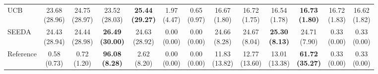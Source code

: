 {\begin{tabular}{l|cccccc|cccccc}
UCB & {\cellcolor[HTML]{C8E6C9}} \makecell{23.68 \\ (28.96)} & \makecell{24.75 \\ (28.97)} & \makecell{23.52 \\ (28.03)} & \bfseries \makecell{25.44 \\ (29.27)} & \makecell{1.97 \\ (4.47)} & \makecell{0.65 \\ (0.97)} & {\cellcolor[HTML]{C8E6C9}} \makecell{16.67 \\ (1.80)} & \makecell{16.72 \\ (1.75)} & \makecell{16.54 \\ (1.78)} & \bfseries \makecell{16.73 \\ (1.80)} & \makecell{16.72 \\ (1.83)} & \makecell{16.62 \\ (1.82)} \\
SEEDA & {\cellcolor[HTML]{C8E6C9}} \makecell{24.43 \\ (28.94)} & \makecell{24.44 \\ (28.98)} & \bfseries \makecell{26.49 \\ (30.00)} & \makecell{24.63 \\ (28.92)} & \makecell{0.00 \\ (0.00)} & \makecell{0.00 \\ (0.00)} & {\cellcolor[HTML]{C8E6C9}} \makecell{24.66 \\ (8.28)} & \makecell{24.67 \\ (8.04)} & \bfseries \makecell{25.30 \\ (8.13)} & \makecell{24.71 \\ (7.90)} & \makecell{0.33 \\ (0.00)} & \makecell{0.33 \\ (0.00)} \\
Reference & {\cellcolor[HTML]{C8E6C9}} \makecell{0.58 \\ (0.73)} & \makecell{0.72 \\ (1.20)} & \bfseries \makecell{96.08 \\ (8.28)} & \makecell{2.62 \\ (8.20)} & \makecell{0.00 \\ (0.00)} & \makecell{0.00 \\ (0.00)} & {\cellcolor[HTML]{C8E6C9}} \makecell{11.83 \\ (13.82)} & \makecell{12.77 \\ (13.60)} & \makecell{13.01 \\ (13.38)} & \bfseries \makecell{61.72 \\ (35.27)} & \makecell{0.33 \\ (0.00)} & \makecell{0.33 \\ (0.00)} \\

\end{tabular}}
